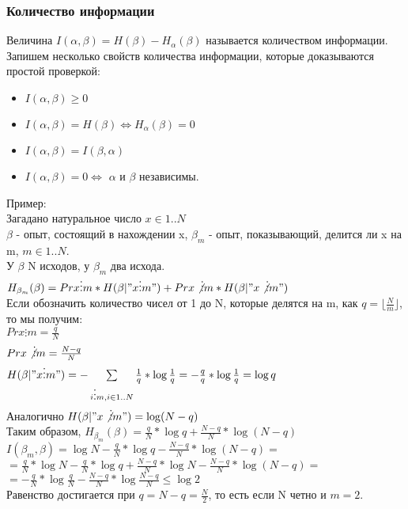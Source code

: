 \subsubsection{Количество информации}
Величина $I(\alpha, \beta) = H(\beta) - H_{\alpha}(\beta)$ называется количеством информации.\\
Запишем несколько свойств количества информации, которые доказываются простой проверкой:\\
\begin{itemize}
\item $I(\alpha, \beta) \geq 0$\\
\item $I(\alpha, \beta) = H(\beta) \Leftrightarrow H_{\alpha}(\beta) = 0$\\
\item $I(\alpha, \beta) = I(\beta, \alpha)$\\
\item $I(\alpha, \beta) = 0 \Leftrightarrow$ $\alpha$ и $\beta$ независимы.
\end{itemize}
Пример:\\
Загадано натуральное число $x \in 1..N$\\
$\beta$ - опыт, состоящий в нахождении x, $\beta_m$ - опыт, показывающий, делится ли x на m, $m \in 1..N$.\\
У $\beta$ N исходов, у $\beta_m$ два исхода.\\
$H_{\beta_m}(\beta) = Pr{x \vdots m} * H(\beta | "x \vdots m") + Pr{x \not\vdots m} * H(\beta | "x \not\vdots m")$\\
Если обозначить количество чисел от 1 до N, которые делятся на m, как $q = \lfloor \frac{N}{m} \rfloor$, то мы получим:\\
$Pr{x \vdots m} = \frac{q}{N}$\\
$Pr{x \not\vdots m} = \frac{N - q}{N}$\\
$H(\beta | "x \vdots m") = -\sum\limits_{i \vdots m, i \in 1..N} \frac{1}{q} * \log \frac{1}{q} = -\frac{q}{q} * \log \frac{1}{q} = \log q$\\
Аналогично $H(\beta | "x \not\vdots m") = \log (N - q)$\\
Таким образом, $H_{\beta_m}(\beta) = \frac{q}{N} * \log q + \frac{N - q}{N} * \log (N - q)$\\
$I(\beta_m, \beta) = \log N - \frac{q}{N} * \log q - \frac{N - q}{N} * \log (N - q) = $\\
$ = \frac{q}{N} * \log N - \frac{q}{N} * \log q + \frac{N - q}{N} * \log N - \frac{N - q}{N} * \log (N - q) = $\\
$ = -\frac{q}{N} * \log \frac{q}{N} - \frac{N - q}{N} * \log \frac{N - q}{N} \leq \log 2$\\
Равенство достигается при $q = N - q = \frac{N}{2}$, то есть если N четно и $m = 2$.